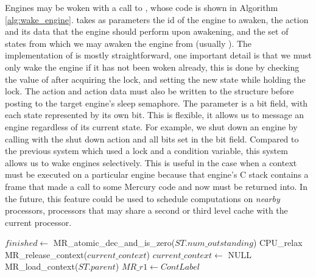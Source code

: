 Engines may be woken with a call to \wakeengine,
whose code is shown in Algorithm \ref{alg:wake_engine}.
\wakeengine takes as parameters the id of the engine to awaken,
the action and its data that the engine should perform upon awakening,
and the set of states from which we may awaken the engine from (usually
).
The implementation of \wakeengine is mostly straightforward,
one important detail is that we must only wake the engine if it has not
been woken already, this is done by checking the value of
 after acquiring the lock,
and setting the new state while holding the lock.
The action and action data must also be written to the
\enginesleepsync structure before posting to the target engine's sleep
semaphore.
The parameter  is a bit field, with each state represented by
its own bit.
This is flexible, it allows us to message an engine regardless of its
current state.
For example,
we shut down an engine by calling \wakeengine with the shut down action and
all bits set in the  bit field.
Compared to the previous system which used a lock and a condition variable,
this system allows us to wake engines selectively.
This is useful in the case when a context must be executed on a particular
engine because that engine's C stack contains a frame that made a call to
some Mercury code and now must be returned into.
In the future, this feature could be used to schedule computations on
\emph{nearby} processors,
processors that may share a second or third level cache with the current
processor.

\begin{algorithm}[tbp]
\begin{algorithmic}[1]
  \State $finished \gets$ MR\_atomic\_dec\_and\_is\_zero($ST.num\_outstanding$)
        \State CPU\_relax
      \EndWhile
      \State MR\_release\_context($current\_context$)
      \State $current\_context \gets$ NULL
      \State MR\_load\_context($ST.parent$)
    \EndIf
  \Else
      \State $MR\_r1 \gets ContLabel$
    \Else
    \EndIf
  \EndIf
\EndProcedure
\end{algorithmic}
\caption{\joinandcontinue}
\label{alg:join_and_continue_ws2}
\end{algorithm}

